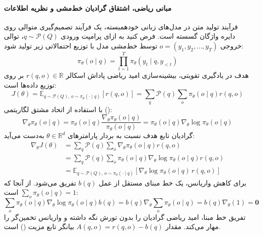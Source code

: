 \paragraph*{مبانی ریاضی، اشتقاق گرادیان خط‌مشی و نظریه اطلاعات}
فرآیند تولید متن در مدل‌های زبانی خودهمبسته، یک فرآیند تصمیم‌گیری متوالی روی دایره واژگان گسسته است. فرض کنید به ازای پرامپت ورودی $q \sim \mathcal{P}(Q)$، توالی خروجی $o = (y_1, y_2, \dots, y_T)$ توسط خط‌مشی مدل با توزیع احتمالاتی زیر تولید شود:
\begin{equation}
    \pi_\theta(o \mid q) = \prod_{t=1}^T \pi_\theta(y_t \mid q, y_{<t})
\end{equation}
هدف در یادگیری تقویتی، بیشینه‌سازی امید ریاضی پاداش اسکالر $r(q, o) \in \mathbb{R}$ بر روی توزیع داده‌ها است:
\begin{equation}
    J(\theta) = \mathbb{E}_{q \sim \mathcal{P}(Q), \, o \sim \pi_\theta(\cdot \mid q)} \left[ r(q, o) \right] = \sum_{q} \mathcal{P}(q) \sum_{o} \pi_\theta(o \mid q) r(q, o)
\end{equation}
با استفاده از اتحاد مشتق لگاریتمی ():
\begin{equation}
    \nabla_\theta \pi_\theta(o \mid q) = \pi_\theta(o \mid q) \frac{\nabla_\theta \pi_\theta(o \mid q)}{\pi_\theta(o \mid q)} = \pi_\theta(o \mid q) \nabla_\theta \log \pi_\theta(o \mid q)
\end{equation}
گرادیان تابع هدف نسبت به بردار پارامترهای $\theta \in \mathbb{R}^d$ به‌دست می‌آید:
\begin{equation}
\begin{aligned}
    \nabla_\theta J(\theta) &= \sum_{q} \mathcal{P}(q) \sum_{o} \nabla_\theta \pi_\theta(o \mid q) r(q, o) \\
    &= \sum_{q} \mathcal{P}(q) \sum_{o} \pi_\theta(o \mid q) \nabla_\theta \log \pi_\theta(o \mid q) r(q, o) \\
    &= \mathbb{E}_{q \sim \mathcal{P}(Q), \, o \sim \pi_\theta(\cdot \mid q)} \left[ \nabla_\theta \log \pi_\theta(o \mid q) \, r(q, o) \right]
\end{aligned}
\end{equation}
برای کاهش واریانس، یک خط مبنای مستقل از عمل $b(q)$ تفریق می‌شود. از آنجا که $\sum_o \pi_\theta(o \mid q) = 1$ است:
\begin{equation}
    \sum_{o} \pi_\theta(o \mid q) \nabla_\theta \log \pi_\theta(o \mid q) b(q) = b(q) \nabla_\theta \sum_{o} \pi_\theta(o \mid q) = b(q) \nabla_\theta (1) = \mathbf{0}
\end{equation}
تفریق خط مبنا، امید ریاضی گرادیان را بدون تورش نگه داشته و واریانس تخمین‌گر را مهار می‌کند. مقدار $A(q, o) = r(q, o) - b(q)$ بیانگر تابع مزیت () است.

